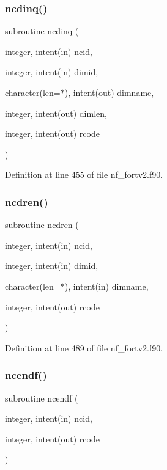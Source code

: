 \subsubsection{\texorpdfstring{ncdinq()}{ncdinq()}}
{\footnotesize\ttfamily subroutine ncdinq (\begin{DoxyParamCaption}\item[{integer, intent(in)}]{ncid,  }\item[{integer, intent(in)}]{dimid,  }\item[{character(len=$\ast$), intent(out)}]{dimname,  }\item[{integer, intent(out)}]{dimlen,  }\item[{integer, intent(out)}]{rcode }\end{DoxyParamCaption})}



Definition at line 455 of file nf\+\_\+fortv2.\+f90.

\mbox{\label{nf__fortv2_8f90_ade22791003f60c336b970147d68ceae3}} 
\subsubsection{\texorpdfstring{ncdren()}{ncdren()}}
{\footnotesize\ttfamily subroutine ncdren (\begin{DoxyParamCaption}\item[{integer, intent(in)}]{ncid,  }\item[{integer, intent(in)}]{dimid,  }\item[{character(len=$\ast$), intent(in)}]{dimname,  }\item[{integer, intent(out)}]{rcode }\end{DoxyParamCaption})}



Definition at line 489 of file nf\+\_\+fortv2.\+f90.

\mbox{\label{nf__fortv2_8f90_a0397fd550c269ff18340d1786e34d6f6}} 
\subsubsection{\texorpdfstring{ncendf()}{ncendf()}}
{\footnotesize\ttfamily subroutine ncendf (\begin{DoxyParamCaption}\item[{integer, intent(in)}]{ncid,  }\item[{integer, intent(out)}]{rcode }\end{DoxyParamCaption})}



